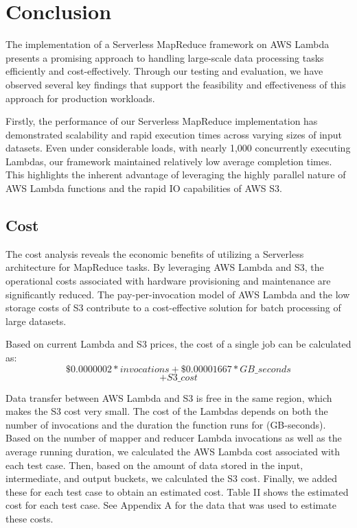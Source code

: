 \section{Conclusion}

The implementation of a Serverless MapReduce framework on AWS Lambda presents a promising approach to handling large-scale data processing tasks efficiently and cost-effectively. Through our testing and evaluation, we have observed several key findings that support the feasibility and effectiveness of this approach for production workloads.

Firstly, the performance of our Serverless MapReduce implementation has demonstrated scalability and rapid execution times across varying sizes of input datasets. Even under considerable loads, with nearly 1,000 concurrently executing Lambdas, our framework maintained relatively low average completion times. This highlights the inherent advantage of leveraging the highly parallel nature of AWS Lambda functions and the rapid IO capabilities of AWS S3.

\subsection{Cost}

The cost analysis reveals the economic benefits of utilizing a Serverless architecture for MapReduce tasks. By leveraging AWS Lambda and S3, the operational costs associated with hardware provisioning and maintenance are significantly reduced. The pay-per-invocation model of AWS Lambda and the low storage costs of S3 contribute to a cost-effective solution for batch processing of large datasets.

Based on current Lambda and S3 prices, the cost of a single job can be calculated as:
\[\$0.0000002 * invocations + \$0.00001667 * GB\_seconds \]
\[+ S3\_cost\]

Data transfer between AWS Lambda and S3 is free in the same region, which makes the S3 cost very small. The cost of the Lambdas depends on both the number of invocations and the duration the function runs for (GB-seconds). Based on the number of mapper and reducer Lambda invocations as well as the average running duration, we calculated the AWS Lambda cost associated with each test case. Then, based on the amount of data stored in the input, intermediate, and output buckets, we calculated the S3 cost. Finally, we added these for each test case to obtain an estimated cost. Table II shows the estimated cost for each test case. See Appendix A for the data that was used to estimate these costs.

